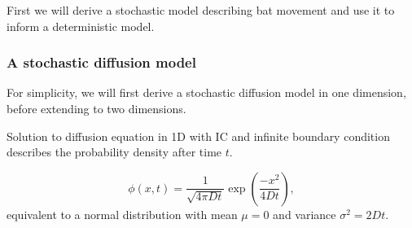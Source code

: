 
First we will derive a stochastic model describing bat movement and use it to inform a deterministic model.

	\subsubsection{A stochastic diffusion model}

	For simplicity, we will first derive a stochastic diffusion model in one
	dimension, before extending to two dimensions.

	Solution to diffusion equation in 1D with IC and infinite boundary condition describes the probability
	density after time $t$.

	\begin{equation}
\phi(x,t) = \frac{1}{\sqrt{4\pi Dt}}\exp \left(\frac{-x^2}{4Dt} \right) ,
\label{eqn:diffusion_solution1d}
	\end{equation}
%
equivalent to a normal distribution with mean $\mu = 0$ and variance $\sigma^2 =
2Dt$.

